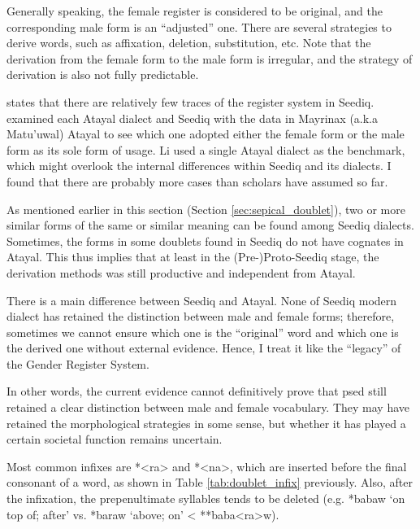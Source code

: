 Generally speaking, the female register is considered to be original, and the corresponding male form is an ``adjusted'' one. There are several strategies to derive words, such as affixation, deletion, substitution, etc. Note that the derivation from the female form to the male form is irregular, and the strategy of derivation is also not fully predictable.

\textcite[157]{goderich2020phd} states that there are relatively few traces of the register system in Seediq. \textcite{li1982gender} examined each Atayal dialect and Seediq with the data in Mayrinax (a.k.a Matu'uwal) Atayal to see which one adopted either the female form or the male form as its sole form of usage. Li used a single Atayal dialect as the benchmark, which might overlook the internal differences within Seediq and its dialects. I found that there are probably more cases than scholars have assumed so far. 

As mentioned earlier in this section (Section \ref{sec:sepical_doublet}), two or more similar forms of the same or similar meaning can be found among Seediq dialects. Sometimes, the forms in some doublets found in Seediq do not have cognates in Atayal. This thus implies that at least in the (Pre-)Proto-Seediq stage, the derivation methods was still productive and independent from Atayal.

There is a main difference between Seediq and Atayal. None of Seediq modern dialect has retained the distinction between male and female forms; therefore, sometimes we cannot ensure which one is the ``original'' word and which one is the derived one without external evidence. Hence, I treat it like the ``legacy'' of the Gender Register System. 

In other words, the current evidence cannot definitively prove that \acl{psed} still retained a clear distinction between male and female vocabulary. They may have retained the morphological strategies in some sense, but whether it has played a certain societal function remains uncertain.


Most common infixes are *<ra> and *<na>, which are inserted before the final consonant of a word, as shown in Table \ref{tab:doublet_infix} previously. Also, after the infixation, the prepenultimate syllables tends to be deleted (e.g. *babaw `on top of; after' vs. *baraw `above; on' < **baba<ra>w).


